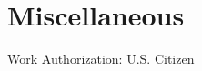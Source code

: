 \documentclass[letterpaper]{scrartcl}
\begin{document}
%
%

\section*{Miscellaneous}
\begin{list1}
\item
  \begin{list2}
  \item Work Authorization: U.S. Citizen
  \end{list2}
\end{list1}
\end{document}
